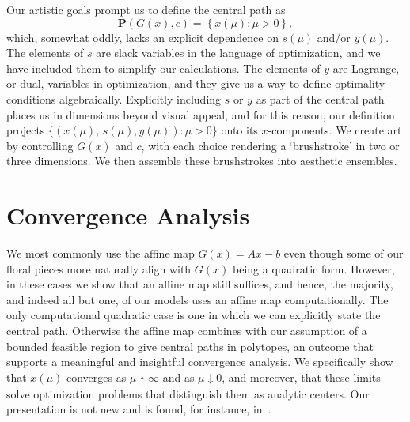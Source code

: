 \documentclass{article}
\def\bP{\mathbf{P}}
\begin{document}
Our artistic goals prompt us to define the central path as
\[
\bP(G(x), c) = \left\{ x(\mu) : \mu > 0 \right\},
\]
which, somewhat oddly, lacks an explicit dependence on $s(\mu)$ 
and/or $y(\mu)$. The elements of $s$ are slack variables in the language 
of optimization, and we have included them to simplify our calculations.
The elements of $y$ are Lagrange, or dual, variables in optimization,
and they give us a way to define optimality conditions algebraically. 
Explicitly including $s$ or $y$ as part of the central path places 
us in dimensions beyond visual appeal, and for this reason, our 
definition projects $\{ (x(\mu), \, s(\mu), y(\mu)) : \mu > 0 \}$ onto 
its $x$-components. We create art by controlling $G(x)$ and 
$c$, with each choice rendering a `brushstroke' in two or
three dimensions. We then assemble these brushstrokes into 
aesthetic ensembles.

\section{Convergence Analysis} \label{sec-conv}

We most commonly use the affine map $G(x) = Ax - b$ even though some of our
floral pieces more naturally align with $G(x)$ being a quadratic form. 
However, in these cases we show that an affine map still suffices, and
hence, the majority, and indeed all but one, of our models uses an affine map
computationally. The only computational quadratic case is one in which we can 
explicitly state the central path. Otherwise the affine map combines with our 
assumption of a bounded feasible region to give central paths in polytopes, 
an outcome that supports a meaningful and insightful convergence analysis. We 
specifically show that $x(\mu)$ converges as $\mu \uparrow \infty$ and as 
$\mu \downarrow 0$, and moreover, that these limits solve optimization problems 
that distinguish them as analytic centers. Our presentation is not new and is found,
for instance, in~\cite{roos2005}. 
\end{document}
